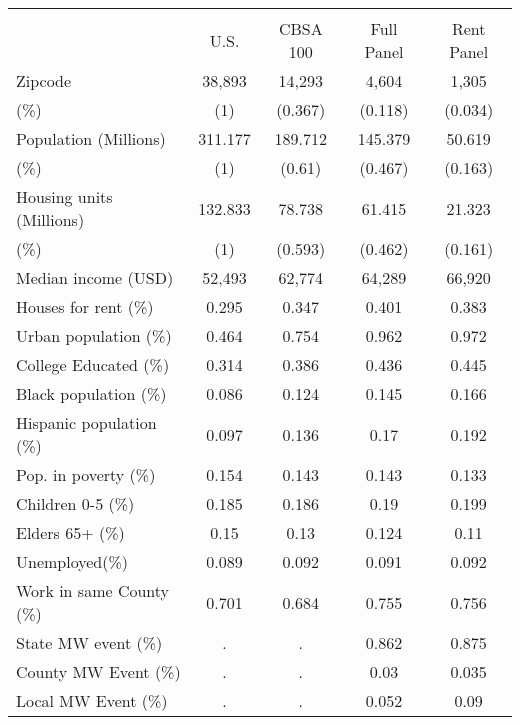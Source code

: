\begin{tabular}{l*{4}{c}}
\hline\hline
            &           &            &            &            \\
            &        U.S.&    CBSA 100&  Full Panel&  Rent Panel\\
\hline
Zipcode     &       38,893&       14,293&        4,604&        1,305\\
(\%)        &           (1)&        (0.367)&    (0.118)&        (0.034)\\
Population (Millions)&     311.177&     189.712&     145.379&      50.619\\
(\%)        &           (1)&         (0.61)&        (0.467)&        (0.163)\\
Housing units (Millions)&     132.833&      78.738&      61.415&      21.323\\
(\%)        &           (1)&        (0.593)&        (0.462)&        (0.161)\\
Median income (USD)&       52,493&       62,774&       64,289&       66,920\\
Houses for rent (\%)&        0.295&        0.347&        0.401&        0.383\\
Urban population (\%)&        0.464&        0.754&        0.962&        0.972\\
College Educated (\%)&        0.314&        0.386&        0.436&        0.445\\
Black population (\%)&        0.086&        0.124&        0.145&        0.166\\
Hispanic population (\%)&     0.097&        0.136&         0.17&        0.192\\
Pop. in poverty (\%)&         0.154&        0.143&        0.143&        0.133\\
Children 0-5 (\%)&           0.185&         0.186&         0.19&        0.199\\
Elders 65+ (\%)&             0.15&         0.13&          0.124&        0.11\\
Unemployed(\%)&              0.089&        0.092&          0.091&       0.092\\
Work in same County (\%)&    0.701&        0.684&          0.755&       0.756\\
State MW event (\%)&           .&           .&             0.862&       0.875\\
County MW Event (\%)&           .&          .&         0.03&        0.035\\
Local MW Event (\%)&           .&           .&        0.052&         0.09\\

\end{tabular}
